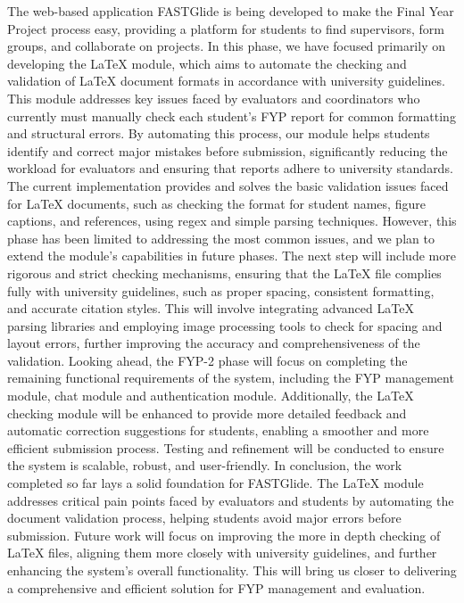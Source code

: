 \documentclass{FastFyp}
\begin{document}
The web-based application FASTGlide is being developed to make the Final Year Project  process easy, providing a platform for students to find supervisors, form groups, and collaborate on projects. In this phase, we have focused primarily on developing the LaTeX module, which aims to automate the checking and validation of LaTeX document formats in accordance with university guidelines. This module addresses key issues faced by evaluators and coordinators who currently must manually check each student's FYP report for common formatting and structural errors. By automating this process, our module helps students identify and correct major mistakes before submission, significantly reducing the workload for evaluators and ensuring that reports adhere to university standards.
The current implementation provides and solves the basic validation issues faced for LaTeX documents, such as checking the format for student names, figure captions, and references, using regex and simple parsing techniques. However, this phase has been limited to addressing the most common issues, and we plan to extend the module’s capabilities in future phases. The next step will include more rigorous and strict checking mechanisms, ensuring that the LaTeX file complies fully with university guidelines, such as proper spacing, consistent formatting, and accurate citation styles. This will involve integrating advanced LaTeX parsing libraries and employing image processing tools to check for spacing and layout errors, further improving the accuracy and comprehensiveness of the validation.
Looking ahead, the FYP-2 phase will focus on completing the remaining functional requirements of the system, including the FYP management module, chat module and authentication module. Additionally, the LaTeX checking module will be enhanced to provide more detailed feedback and automatic correction suggestions for students, enabling a smoother and more efficient submission process. Testing and refinement will be conducted to ensure the system is scalable, robust, and user-friendly.
In conclusion, the work completed so far lays a solid foundation for FASTGlide. The LaTeX module addresses critical pain points faced by evaluators and students by automating the document validation process, helping students avoid major errors before submission. Future work will focus on improving the more in depth checking of LaTeX files, aligning them more closely with university guidelines, and further enhancing the system’s overall functionality. This will bring us closer to delivering a comprehensive and efficient solution for FYP management and evaluation.



{

}
\end{document}
